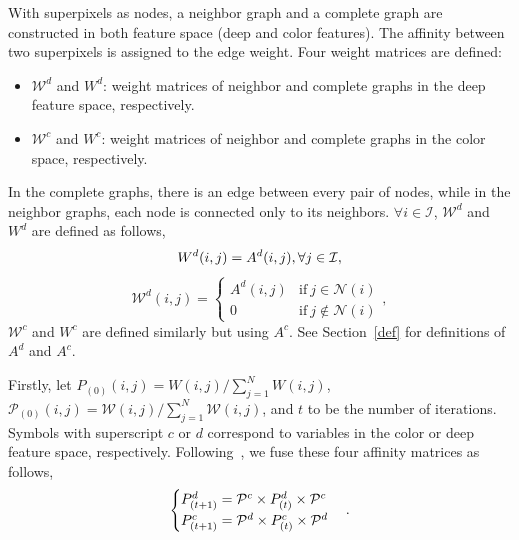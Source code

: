 \documentclass[journal]{IEEEtran}
\begin{document}
With superpixels as nodes, a neighbor graph and a complete graph are constructed in both feature space (deep and color features). The affinity between two superpixels is assigned to the edge weight. Four weight matrices are defined:
\begin{itemize}
	\item $\mathcal{W}^d$ and $W^d$: weight matrices of neighbor and complete graphs in the deep feature space, respectively.
	\item $\mathcal{W}^c$ and $W^c$: weight matrices of neighbor and complete graphs in the color space, respectively.
\end{itemize}
In the complete graphs, there is an edge between every pair of nodes, while in the neighbor graphs, each node is connected only to its neighbors. $\forall i \in \mathcal{I}$, $\mathcal{W}^d$ and $W^d$ are defined as follows,
\begin{equation}
\setlength{\abovedisplayskip}{2pt}
\setlength{\belowdisplayskip}{2pt}
W^d(i, j) = A^d(i, j), \forall j \in \mathcal{I}, 
\end{equation}
\begin{equation}
\mathcal{W}^d(i, j) = \begin{cases}
A^d(i, j) &\mbox{if}~j \in \mathcal{N}(i) \\
0 &\mbox{if}~j \notin \mathcal{N}(i)
\end{cases}, 
\end{equation}
$\mathcal{W}^c$ and $W^c$ are defined similarly but using $A^c$. See Section~\ref{def} for definitions of $A^d$ and $A^c$. 

Firstly, let $P_{(0)}(i, j) = W(i, j)/\sum_{j=1}^N W(i, j)$, $\mathcal{P}_{(0)}(i, j) = \mathcal{W}(i, j)/\sum_{j=1}^N \mathcal{W}(i, j)$, and $t$ to be the number of iterations. Symbols with superscript $c$ or $d$ correspond to variables in the color or deep feature space, respectively. Following~\cite{Tu2012Unsupervised}, we fuse these four affinity matrices as follows,
\begin{equation}
\setlength{\abovedisplayskip}{2pt}
\setlength{\belowdisplayskip}{2pt}
\label{tu}
\begin{cases}
P^d_{(t+1)} = \mathcal{P}^c \times P^d_{(t)} \times \mathcal{P}^c\\
P^c_{(t+1)} = \mathcal{P}^d \times P^c_{(t)} \times \mathcal{P}^d
\end{cases}. 
\end{equation}
\end{document}
